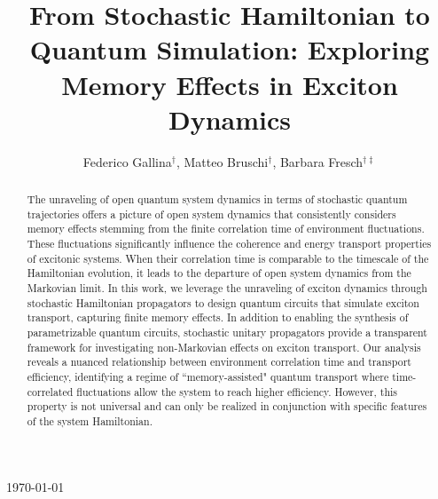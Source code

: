 \documentclass[12pt, amsmath, amssymb, graphicx]{iopart}
\begin{document}
\title[]{From Stochastic Hamiltonian to Quantum Simulation: Exploring Memory Effects in Exciton Dynamics}

\author{Federico Gallina$^\dag$, Matteo Bruschi$^\dag$, Barbara Fresch$^{\dag \ddag}$}
\address{\dag Dipartimento di Scienze Chimiche, Università degli Studi di Padova, via Marzolo 1, Padua 35131, Italy}
\address{\ddag Padua Quantum Technologies Research Center, Università degli Studi di Padova, via Gradenigo 6/A, Padua 35131, Italy}

%
\vspace{10pt}
\begin{indented}
\item[]\today
\end{indented}
%

\begin{abstract}
The unraveling of open quantum system dynamics in terms of stochastic quantum trajectories offers a picture of open system dynamics that consistently considers memory effects stemming from the finite correlation time of environment fluctuations. These fluctuations significantly influence the coherence and energy transport properties of excitonic systems. When their correlation time is comparable to the timescale of the Hamiltonian evolution, it leads to the departure of open system dynamics from the Markovian limit. In this work, we leverage the unraveling of exciton dynamics through stochastic Hamiltonian propagators to design quantum circuits that simulate exciton transport, capturing finite memory effects. In addition to enabling the synthesis of parametrizable quantum circuits, stochastic unitary propagators provide a transparent framework for investigating non-Markovian effects on exciton transport. Our analysis reveals a nuanced relationship between environment correlation time and transport efficiency, identifying a regime of ``memory-assisted" quantum transport where time-correlated fluctuations allow the system to reach higher efficiency. However, this property is not universal and can only be realized in conjunction with specific features of the system Hamiltonian.

\end{abstract}

%
%
%
\maketitle
% 
%
\end{document}
